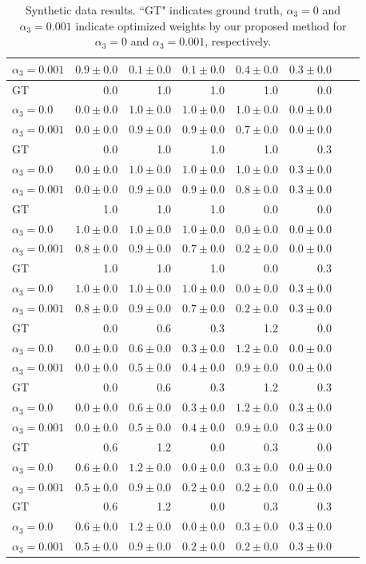 \documentclass{article}
\theoremstyle{plain}
\theoremstyle{definition}
\theoremstyle{remark}
\begin{document}
\begin{table}[htb!]
\begin{tabular}{lrrrrrrr}
$\alpha_3=0.001$&$0.9\pm0.0$&$0.1\pm0.0$&$0.1\pm0.0$&$0.4\pm0.0$&$0.3\pm0.0$&\\
\midrule
GT&0.0&1.0&1.0&1.0&0.0\\
$\alpha_3=0.0$&$0.0\pm0.0$&$1.0\pm0.0$&$1.0\pm0.0$&$1.0\pm0.0$&$0.0\pm0.0$&\\
$\alpha_3=0.001$&$0.0\pm0.0$&$0.9\pm0.0$&$0.9\pm0.0$&$0.7\pm0.0$&$0.0\pm0.0$&\\
\midrule
GT&0.0&1.0&1.0&1.0&0.3\\
$\alpha_3=0.0$&$0.0\pm0.0$&$1.0\pm0.0$&$1.0\pm0.0$&$1.0\pm0.0$&$0.3\pm0.0$&\\
$\alpha_3=0.001$&$0.0\pm0.0$&$0.9\pm0.0$&$0.9\pm0.0$&$0.8\pm0.0$&$0.3\pm0.0$&\\
\midrule
GT&1.0&1.0&1.0&0.0&0.0\\
$\alpha_3=0.0$&$1.0\pm0.0$&$1.0\pm0.0$&$1.0\pm0.0$&$0.0\pm0.0$&$0.0\pm0.0$&\\
$\alpha_3=0.001$&$0.8\pm0.0$&$0.9\pm0.0$&$0.7\pm0.0$&$0.2\pm0.0$&$0.0\pm0.0$&\\
\midrule
GT&1.0&1.0&1.0&0.0&0.3\\
$\alpha_3=0.0$&$1.0\pm0.0$&$1.0\pm0.0$&$1.0\pm0.0$&$0.0\pm0.0$&$0.3\pm0.0$&\\
$\alpha_3=0.001$&$0.8\pm0.0$&$0.9\pm0.0$&$0.7\pm0.0$&$0.2\pm0.0$&$0.3\pm0.0$&\\
\midrule
GT&0.0&0.6&0.3&1.2&0.0\\
$\alpha_3=0.0$&$0.0\pm0.0$&$0.6\pm0.0$&$0.3\pm0.0$&$1.2\pm0.0$&$0.0\pm0.0$&\\
$\alpha_3=0.001$&$0.0\pm0.0$&$0.5\pm0.0$&$0.4\pm0.0$&$0.9\pm0.0$&$0.0\pm0.0$&\\
\midrule
GT&0.0&0.6&0.3&1.2&0.3\\
$\alpha_3=0.0$&$0.0\pm0.0$&$0.6\pm0.0$&$0.3\pm0.0$&$1.2\pm0.0$&$0.3\pm0.0$&\\
$\alpha_3=0.001$&$0.0\pm0.0$&$0.5\pm0.0$&$0.4\pm0.0$&$0.9\pm0.0$&$0.3\pm0.0$&\\
\midrule
GT&0.6&1.2&0.0&0.3&0.0\\
$\alpha_3=0.0$&$0.6\pm0.0$&$1.2\pm0.0$&$0.0\pm0.0$&$0.3\pm0.0$&$0.0\pm0.0$&\\
$\alpha_3=0.001$&$0.5\pm0.0$&$0.9\pm0.0$&$0.2\pm0.0$&$0.2\pm0.0$&$0.0\pm0.0$&\\
\midrule
GT&0.6&1.2&0.0&0.3&0.3\\
$\alpha_3=0.0$&$0.6\pm0.0$&$1.2\pm0.0$&$0.0\pm0.0$&$0.3\pm0.0$&$0.3\pm0.0$&\\
$\alpha_3=0.001$&$0.5\pm0.0$&$0.9\pm0.0$&$0.2\pm0.0$&$0.2\pm0.0$&$0.3\pm0.0$&\\
\bottomrule
\end{tabular}
\caption{Synthetic data results. ``GT" indicates ground truth, $\alpha_3=0$ and $\alpha_3=0.001$ indicate optimized weights by our proposed method for $\alpha_3=0$ and $\alpha_3=0.001$, respectively.
} 
\label{tab:synthetic_res}
\end{table}
\end{document}
